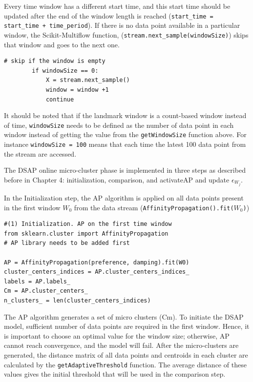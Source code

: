 \documentclass[../UNBThesis2.tex]{subfiles}
\begin{document}
Every time window has a different start time, and this start time should be updated after the end of the window length is reached (\texttt{start\_time = start\_time + time\_period}). If there is no data point available in a particular window, the Scikit-Multiflow function, (\texttt{stream.next\_sample(windowSize)}) skips that window and goes to the next one.
\begin{lstlisting}
# skip if the window is empty
        if windowSize == 0:
            X = stream.next_sample()
            window = window +1
            continue
\end{lstlisting}


It should be noted that if the landmark window is a count-based window instead of time, \texttt{windowSize} needs to be defined as the number of data point in each window instead of getting the value from the \texttt{getWindowSize} function above. For instance \texttt{windowSize = 100} means that each time the latest 100 data point from the stream are accessed.

The DSAP online micro-cluster phase is implemented in three steps as described before in Chapter 4: initialization, comparison, and activateAP and update $\epsilon_{W_j}$.

In the Initialization step, the AP algorithm is applied on all data points present in the first window $W_0$ from the data stream (\texttt{AffinityPropagation().fit($W_0$)})

\begin{lstlisting}
#(1) Initialization. AP on the first time window
from sklearn.cluster import AffinityPropagation 
# AP library needs to be added first

AP = AffinityPropagation(preference, damping).fit(W0)
cluster_centers_indices = AP.cluster_centers_indices_
labels = AP.labels_
Cm = AP.cluster_centers_
n_clusters_ = len(cluster_centers_indices)
\end{lstlisting}

The AP algorithm generates a set of micro clusters (Cm). To initiate the DSAP model, sufficient number of data points are required in the first window. Hence, it is important to choose an optimal value for the window size; otherwise, AP cannot reach convergence, and the model will fail. After the micro-clusters are generated, the distance matrix of all data points and centroids in each cluster are calculated by the \texttt{getAdaptiveThreshold} function. The average distance of these values gives the initial threshold that will be used in the comparison step.
\end{document}
